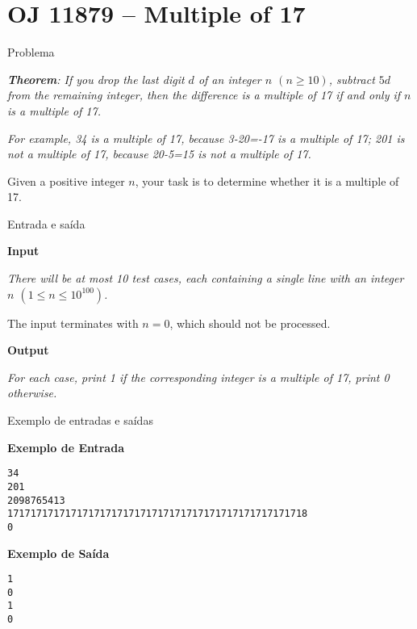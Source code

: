 \section{OJ 11879 -- Multiple of 17}

\begin{frame}[fragile]{Problema}

\begin{center}
\textit{\textbf{Theorem}: If you drop the last digit $d$ of an integer $n$ $(n \geq 10)$, subtract $5d$ from the remaining integer, then the difference is a multiple of 17 if and only if $n$ is a multiple of 17.}
\end{center}

{
\it
For example, 34 is a multiple of 17, because 3-20=-17 is a multiple of 17; 201 is not a multiple of
17, because 20-5=15 is not a multiple of 17.

Given a positive integer $n$, your task is to determine whether it is a multiple of 17.
}

\end{frame}

\begin{frame}[fragile]{Entrada e saída}

\textbf{Input}

{
\it
There will be at most 10 test cases, each containing a single line with an integer $n$ $(1 \leq n \leq 10^{100})$.

The input terminates with $n = 0$, which should not be processed.
}

\vspace{0.1in}

\textbf{Output}

{\it
For each case, print 1 if the corresponding integer is a multiple of 17, print 0 otherwise.
}

\end{frame}

\begin{frame}[fragile]{Exemplo de entradas e saídas}

\textbf{Exemplo de Entrada}
\begin{verbatim}
34
201
2098765413
1717171717171717171717171717171717171717171717171718
0
\end{verbatim}

\textbf{Exemplo de Saída}
\begin{verbatim}
1
0
1
0
\end{verbatim}
\end{frame}

